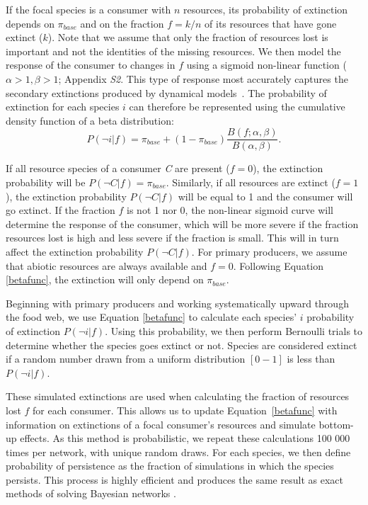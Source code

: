 \documentclass[12pt]{article}
\begin{document}
\begin{spacing}{2.0}
        If the focal species is a consumer with $n$ resources, its probability of extinction depends on $\pi_{base}$ and on the fraction $f = k/n$ of its resources that have gone extinct ($k$).
        Note that we assume that only the fraction of resources lost is important and not the identities of the missing resources.
        We then model the response of the consumer to changes in $f$ using a sigmoid non-linear function ($\alpha > 1, \beta > 1$; Appendix \emph{S2}.
		This type of response most accurately captures the secondary extinctions produced by dynamical models~\citep{Eklof2013}.
		The probability of extinction for each species $i$ can therefore be represented using the cumulative density function of a beta distribution:
		\begin{equation}
		\label{betafunc}
		P(\lnot i|f) = \pi_{base} + (1 - \pi_{base}) \frac{B(f;\alpha,\beta)}{B(\alpha,\beta)}.
		\end{equation}
		
		If all resource species of a consumer \textit{C} are present ($f = 0$), the extinction probability will be $P(\lnot C|f) = \pi_{base}$. 
		Similarly, if all resources are extinct ($f = 1$), the extinction probability $P(\lnot C|f)$ will be equal to 1 and the consumer will go extinct.
		If the fraction $f$ is not 1 nor 0, the non-linear sigmoid curve will determine the response of the consumer, which will be more severe if the fraction resources lost is high and less severe if the fraction is small. This will in turn affect the extinction probability $P(\lnot C|f)$.
		For primary producers, we assume that abiotic resources are always available and $f=0$. Following Equation \ref{betafunc}, the extinction will only depend on $\pi_{base}$.
		
		
        Beginning with primary producers and working systematically upward through the food web, we use Equation \ref{betafunc} to calculate each species' $i$ probability of extinction $P(\lnot i|f)$.
        Using this probability, we then perform Bernoulli trials to determine whether the species goes extinct or not. 
        Species are considered extinct if a random number drawn from a uniform distribution $[0-1]$ is less than $P(\lnot i|f)$.


        These simulated extinctions are used when calculating the fraction of resources lost $f$ for each consumer.
        This allows us to update Equation~\ref{betafunc} with information on extinctions of a focal consumer's resources and simulate bottom-up effects. As this method is probabilistic, we repeat these calculations 100 000 times per network, with unique random draws.
	    For each species, we then define probability of persistence as the fraction of simulations in which the species persists.
	    This process is highly efficient and produces the same result as exact methods of solving Bayesian networks \citep{Haussler2020}.
		

\end{spacing}
\end{document}
